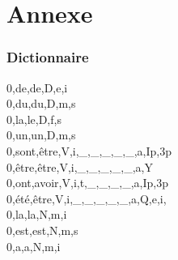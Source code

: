\documentclass{beamer}
\begin{document}
\section{Annexe}

\begin{frame}
   \frametitle{Dictionnaire}
   0,de,de,D,e,i\\
   0,du,du,D,m,s\\
   0,la,le,D,f,s\\
   0,un,un,D,m,s\\
   0,sont,être,V,i,\_,\_,\_,\_,\_,a,Ip,3p\\
   0,être,être,V,i,\_,\_,\_,\_,\_,a,Y\\
   0,ont,avoir,V,i,t,\_,\_,\_,\_,a,Ip,3p\\
   0,été,être,V,i,\_,\_,\_,\_,\_,a,Q,e,i,\\
   0,la,la,N,m,i\\
   0,est,est,N,m,s\\
   0,a,a,N,m,i\\
\end{frame}
\end{document}
